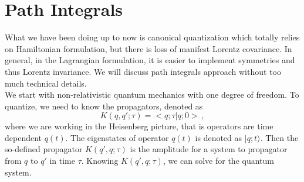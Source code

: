 \documentclass[11pt, onesided]{book}
\theoremstyle{break}
\theoremstyle{break}
\begin{document}
\chapter{Path Integrals}
What we have been doing up to now is canonical quantization which totally relies on Hamiltonian formulation, but there is loss of manifest Lorentz covariance. In general, in the Lagrangian formulation, it is easier to implement symmetries and thus Lorentz invariance. We will discuss path integrals approach without too much technical details. \\

We start with non-relativistic quantum mechanics with one degree of freedom. To quantize, we need to know the propagators, denoted as 
$$K(q,q'; \tau) = <q; \tau | q; 0>\,,$$ where we are working in the Heisenberg picture, that is operators are time dependent $q(t)$. The eigenstates of operator $q(t)$ is denoted as $|q;t\rangle$. Then the so-defined propagator $K(q',q;\tau)$ is the amplitude for a system to propagator from $q$ to $q'$ in time $\tau$. Knowing $K(q',q;\tau)$, we can solve for the quantum system. \\
\end{document}

